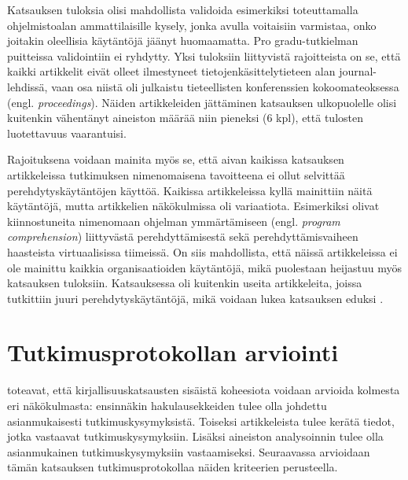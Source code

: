 \documentclass[utf8]{gradu3}
\begin{document}
Katsauksen tuloksia olisi mahdollista validoida esimerkiksi toteuttamalla ohjelmistoalan ammattilaisille kysely, jonka avulla voitaisiin varmistaa, onko joitakin oleellisia käytäntöjä jäänyt huomaamatta. Pro gradu-tutkielman puitteissa validointiin ei ryhdytty. Yksi tuloksiin liittyvistä rajoitteista on se, että kaikki artikkelit eivät olleet ilmestyneet tietojenkäsittelytieteen alan journal-lehdissä, vaan osa niistä oli julkaistu tieteellisten konferenssien kokoomateoksessa (engl. \textit{proceedings}). Näiden artikkeleiden jättäminen katsauksen ulkopuolelle olisi kuitenkin vähentänyt aineiston määrää niin pieneksi (6 kpl), että tulosten luotettavuus vaarantuisi.

Rajoituksena voidaan mainita myös se, että aivan kaikissa katsauksen artikkeleissa tutkimuksen nimenomaisena tavoitteena ei ollut selvittää perehdytyskäytäntöjen käyttöä. Kaikissa artikkeleissa kyllä mainittiin näitä käytäntöjä, mutta artikkelien näkökulmissa oli variaatiota. Esimerkiksi \textcite{yates-ym-2020} olivat kiinnostuneita nimenomaan ohjelman ymmärtämiseen (engl. \textit{program comprehension}) liittyvästä perehdyttämisestä sekä \textcite{hemphill-begel-2011} perehdyttämisvaiheen haasteista virtuaalisissa tiimeissä. On siis mahdollista, että näissä artikkeleissa ei ole mainittu kaikkia organisaatioiden käytäntöjä, mikä puolestaan heijastuu myös katsauksen tuloksiin. Katsauksessa oli kuitenkin useita artikkeleita, joissa tutkittiin juuri perehdytyskäytäntöjä, mikä voidaan lukea katsauksen eduksi
%
\parencites%
    {ju-ym-2021}%
    {britto-ym-2020}%
    {moe-ym-2020}%
    {viviani-murphy-2019}%
    {buchan-ym-2019}%
    {johnson-senges-2010}%
\relax.
%

\section{Tutkimusprotokollan arviointi}
\label{luku-tutkimusprotokollan-arviointi}

\textcite{kitchenham-charters-2007} toteavat, että kirjallisuuskatsausten sisäistä koheesiota voidaan arvioida kolmesta eri näkökulmasta: ensinnäkin hakulausekkeiden tulee olla johdettu asianmukaisesti tutkimuskysymyksistä. Toiseksi artikkeleista tulee kerätä tiedot, jotka vastaavat tutkimuskysymyksiin. Lisäksi aineiston analysoinnin tulee olla asianmukainen tutkimuskysymyksiin vastaamiseksi. Seuraavassa arvioidaan tämän katsauksen tutkimusprotokollaa näiden kriteerien perusteella.
\end{document}
